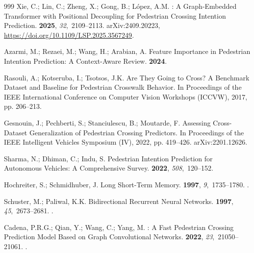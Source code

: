 \documentclass[mti,article,submit,moreauthors]{Definitions/mdpi}
\begin{document}
\begin{thebibliography}{999}
Xie, C.; Lin, C.; Zheng, X.; Gong, B.; L{\'o}pez, A.M.
: A Graph-Embedded Transformer with Positional Decoupling
  for Pedestrian Crossing Intention Prediction.
 {\bf 2025}, {\em
  32},~2109--2113.
\newblock arXiv:2409.20223, {\url{https://doi.org/10.1109/LSP.2025.3567249}}.

Azarmi, M.; Rezaei, M.; Wang, H.; Arabian, A.
\newblock Feature Importance in Pedestrian Intention Prediction: A
  Context-Aware Review.
 {\bf 2024}.

Rasouli, A.; Kotseruba, I.; Tsotsos, J.K.
\newblock Are They Going to Cross? A Benchmark Dataset and Baseline for
  Pedestrian Crosswalk Behavior.
\newblock In Proceedings of the IEEE International Conference on Computer
  Vision Workshops (ICCVW),  2017, pp. 206--213.

Gesnouin, J.; Pechberti, S.; Stanciulescu, B.; Moutarde, F.
\newblock Assessing Cross-Dataset Generalization of Pedestrian Crossing
  Predictors.
\newblock In Proceedings of the IEEE Intelligent Vehicles Symposium (IV),
  2022, pp. 419--426.
\newblock arXiv:2201.12626.

Sharma, N.; Dhiman, C.; Indu, S.
\newblock Pedestrian Intention Prediction for Autonomous Vehicles: A
  Comprehensive Survey.
 {\bf 2022}, {\em 508},~120--152.

Hochreiter, S.; Schmidhuber, J.
\newblock Long Short-Term Memory.
 {\bf 1997}, {\em 9},~1735--1780.
.

Schuster, M.; Paliwal, K.K.
\newblock Bidirectional Recurrent Neural Networks.
 {\bf 1997}, {\em
  45},~2673--2681.
.

Cadena, P.R.G.; Qian, Y.; Wang, C.; Yang, M.
: A Fast Pedestrian Crossing Prediction Model
  Based on Graph Convolutional Networks.
 {\bf
  2022}, {\em 23},~21050--21061.
.


\end{thebibliography}
\end{document}
